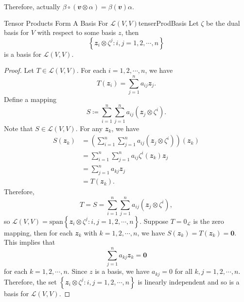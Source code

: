 \documentclass[math, code]{amznotes}
\theoremstyle{remark}
\newcommand{\zero}{\mathbf{0}}
\begin{document}
Therefore, actually $\beta \circ (\mathbfit{v} \otimes \alpha) = \beta(\mathbfit{v})\alpha$.
\begin{probox}{Tensor Products Form A Basis For $\mathcal{L}(V, V)$}{tenserProdBasis}
    Let $\zeta$ be the dual basis for $V$ with respect to some basis $z$, then 
    \begin{equation*}
        \left\{\mathbfit{z}_i \otimes \zeta^j \colon i, j = 1, 2, \cdots, n\right\}
    \end{equation*}
    is a basis for $\mathcal{L}(V, V)$.
    \tcblower
    \begin{proof}
        Let $T \in \mathcal{L}(V, V)$. For each $i = 1, 2, \cdots, n$, we have
        \begin{equation*}
            T(\mathbfit{z}_i) = \sum_{j = 1}^{n}a_{ij}\mathbfit{z}_j.
        \end{equation*}
        Define a mapping
        \begin{equation*}
            S \coloneqq \sum_{i = 1}^{n}\sum_{j = 1}^{n}a_{ij}(\mathbfit{z}_j \otimes \zeta^i).
        \end{equation*}
        Note that $S \in \mathcal{L}(V, V)$. For any $\mathbfit{z}_k$, we have
        \begin{align*}
            S(\mathbfit{z}_k) & = \left(\sum_{i = 1}^{n}\sum_{j = 1}^{n}a_{ij}(\mathbfit{z}_j \otimes \zeta^i)\right)(\mathbfit{z}_k) \\
            & = \sum_{i = 1}^{n}\sum_{j = 1}^{n}a_{ij}\zeta^i(\mathbfit{z}_k)\mathbfit{z}_j \\
            & = \sum_{j = 1}^{n}a_{kj}\mathbfit{z}_j \\
            & = T(\mathbfit{z}_k).
        \end{align*}
        Therefore, 
        \begin{equation*}
            T = S = \sum_{i = 1}^{n}\sum_{j = 1}^{n}a_{ij}(\mathbfit{z}_j \otimes \zeta^i),
        \end{equation*} 
        so $\mathcal{L}(V, V) = \mathrm{span}\left\{\mathbfit{z}_i \otimes \zeta^j \colon i, j = 1, 2, \cdots, n\right\}$. Suppose $T = 0_{\mathcal{L}}$ is the zero mapping, then for each $\mathbfit{z}_k$ with $k = 1, 2, \cdots, n$, we have $S(\mathbfit{z}_k) = T(\mathbfit{z}_k) = \zero$. This implies that 
        \begin{equation*}
            \sum_{j = 1}^{n}a_{kj}\mathbfit{z}_k = \zero
        \end{equation*}
        for each $k = 1, 2, \cdots, n$. Since $z$ is a basis, we have $a_{kj} = 0$ for all $k, j = 1, 2, \cdots, n$. Therefore, the set $\left\{\mathbfit{z}_i \otimes \zeta^j \colon i, j = 1, 2, \cdots, n\right\}$
        is linearly independent and so is a basis for $\mathcal{L}(V, V)$.
    \end{proof}
\end{probox}
\end{document}

